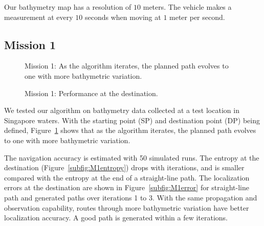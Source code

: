 Our bathymetry map has a resolution of $10$ meters. The vehicle makes a measurement at every $10$ seconds when moving at $1$ meter per second.

\subsection{Mission 1}

\begin{figure}[htbp]
\centering
{}
\hfil
{}
\hfil
{}
\caption{Mission 1: As the algorithm iterates, the planned path evolves to one with more bathymetric variation.}
\label{fig:M1allpaths}
\end{figure}

\begin{figure}[!t]
\centering
{}
\hfil
{}
\caption{Mission 1: Performance at the destination.}
\label{fig:M1}
\end{figure}

We tested our algorithm on bathymetry data collected at a test location in Singapore waters. With the starting point (SP) and destination point (DP) being defined, Figure~\ref{fig:M1allpaths} shows that as the algorithm iterates, the planned path evolves to one with more bathymetric variation.

The navigation accuracy is estimated with 50 simulated runs. The entropy at the destination (Figure~\ref{subfig:M1entropy}) drops with iterations, and is smaller compared with the entropy at the end of a straight-line path. The localization errors at the destination are shown in Figure~\ref{subfig:M1error} for straight-line path and generated paths over iterations 1 to 3. With the same propagation and observation capability, routes through more bathymetric variation have better localization accuracy. A good path is generated within a few iterations.


